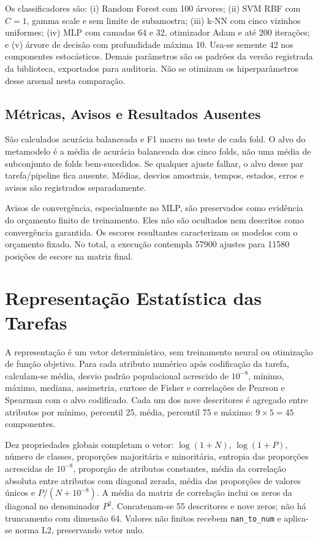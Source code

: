 Os classificadores são: (i) Random Forest com 100 árvores; (ii) SVM RBF com $C=1$, gamma scale e sem limite de subamostra; (iii) k-NN com cinco vizinhos uniformes; (iv) MLP com camadas 64 e 32, otimizador Adam e até 200 iterações; e (v) árvore de decisão com profundidade máxima 10. Usa-se semente 42 nos componentes estocásticos. Demais parâmetros são os padrões da versão registrada da biblioteca, exportados para auditoria. Não se otimizam os hiperparâmetros desse arsenal nesta comparação.

\subsection{Métricas, Avisos e Resultados Ausentes}

São calculados acurácia balanceada e F1 macro no teste de cada fold. O alvo do metamodelo é a média de acurácia balanceada dos cinco folds, não uma média de subconjunto de folds bem-sucedidos. Se qualquer ajuste falhar, o alvo desse par tarefa/pipeline fica ausente. Médias, desvios amostrais, tempos, estados, erros e avisos são registrados separadamente.

Avisos de convergência, especialmente no MLP, são preservados como evidência do orçamento finito de treinamento. Eles não são ocultados nem descritos como convergência garantida. Os escores resultantes caracterizam os modelos com o orçamento fixado. No total, a execução contempla 57900 ajustes para 11580 posições de escore na matriz final.

\section{Representação Estatística das Tarefas}\label{sec:representacaoReconstruida}

A representação é um vetor determinístico, sem treinamento neural ou otimização de função objetivo. Para cada atributo numérico após codificação da tarefa, calculam-se média, desvio padrão populacional acrescido de $10^{-8}$, mínimo, máximo, mediana, assimetria, curtose de Fisher e correlações de Pearson e Spearman com o alvo codificado. Cada um dos nove descritores é agregado entre atributos por mínimo, percentil 25, média, percentil 75 e máximo: $9\times5=45$ componentes.

Dez propriedades globais completam o vetor: $\log(1+N)$, $\log(1+P)$, número de classes, proporções majoritária e minoritária, entropia das proporções acrescidas de $10^{-8}$, proporção de atributos constantes, média da correlação absoluta entre atributos com diagonal zerada, média das proporções de valores únicos e $P/(N+10^{-8})$. A média da matriz de correlação inclui os zeros da diagonal no denominador $P^2$. Concatenam-se 55 descritores e nove zeros; não há truncamento com dimensão 64. Valores não finitos recebem \texttt{nan\_to\_num} e aplica-se norma L2, preservando vetor nulo.

